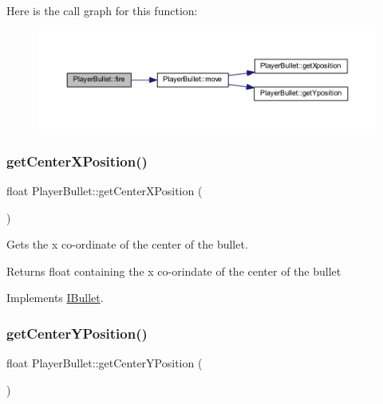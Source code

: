 Here is the call graph for this function\+:\nopagebreak
\begin{figure}[H]
\begin{center}
\leavevmode
\includegraphics[width=350pt]{class_player_bullet_a4ef09e533d8d3016d7e08d9efae238ff_cgraph}
\end{center}
\end{figure}
\mbox{\label{class_player_bullet_a73c27dca47ea3fdcecd82ce4b2089c4a}} 
\subsubsection{\texorpdfstring{get\+Center\+X\+Position()}{getCenterXPosition()}}
{\footnotesize\ttfamily float Player\+Bullet\+::get\+Center\+X\+Position (\begin{DoxyParamCaption}{ }\end{DoxyParamCaption})\hspace{0.3cm}{\ttfamily [virtual]}}



Gets the x co-\/ordinate of the center of the bullet. 

\begin{DoxyReturn}{Returns}
float containing the x co-\/orindate of the center of the bullet 
\end{DoxyReturn}


Implements \hyperlink{class_i_bullet_a43a43e2df81e05a03be42d9025e6dd2a}{I\+Bullet}.

\mbox{\label{class_player_bullet_a7ad2bc922595b9a11373fd42666926ef}} 
\subsubsection{\texorpdfstring{get\+Center\+Y\+Position()}{getCenterYPosition()}}
{\footnotesize\ttfamily float Player\+Bullet\+::get\+Center\+Y\+Position (\begin{DoxyParamCaption}{ }\end{DoxyParamCaption})\hspace{0.3cm}{\ttfamily [virtual]}}




